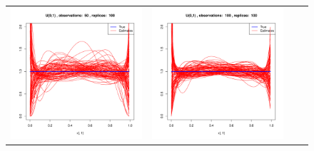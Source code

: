 \begin{figure}[h]
\begin{tabular}{cccc}
	
	\includegraphics[width=\textwidth/4]{../img/uniform/tilted/K2/densities/n50_R100.pdf}
	&
	\includegraphics[width=\textwidth/4]{../img/uniform/tilted/K2/densities/n100_R100.pdf}

\end{tabular}
\end{figure}
